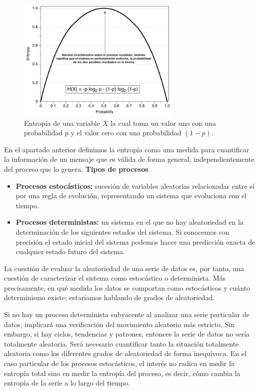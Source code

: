 \documentclass[a4paper,12pt]{article}
\begin{document}
\begin{figure}[H]
	\begin{center}
	\includegraphics[width=0.7\textwidth]{entropy2.png}
  	\caption{Entropía de una variable $X$ la cual toma un valor uno con una probabilidad $p$ y el valor cero con una probabilidad $(1-p)$.}
  	\label{fig:entropy}
  	\end{center}
\end{figure}

En el apartado anterior definimos la entropía como una medida para cuantificar la información de un mensaje que es válida de forma general, independientemente del proceso que lo genera. 
\textbf{Tipos de procesos}
\begin{itemize}
	\item \textbf{Procesos estocásticos:} sucesión de variables aleatorias relacionadas entre sí por una regla de evolución, representando un sistema que evoluciona con el tiempo. 
	\item \textbf{Procesos deterministas:} un sistema en el que no hay aleatoriedad en la determinación de los siguientes estados del sistema. Si conocemos con precisión el estado inicial del sistema podemos hacer una predicción exacta de cualquier estado futuro del sistema.
\end{itemize}

La cuestión de evaluar la aleatoriedad de una serie de datos es, por tanto, una cuestión de caracterizar el sistema como estocástico o determinista. Más precisamente, en qué medida los datos se comportan como estocásticos y cuánto determinismo existe; estaríamos hablando de grados de aleatoriedad. 

Si no hay un proceso determinista subyacente al analizar una serie particular de datos, implicará una verificación del movimiento aleatorio más estricto. Sin embargo, si hay ciclos, tendencias y patrones, entonces la serie de datos no sería totalmente aleatoria. Será necesario cuantificar tanto la situación totalmente aleatoria como los diferentes grados de aleatoriedad de forma inequívoca. En el caso particular de los procesos estocásticos, el interés no radica en medir la entropía total sino en medir la entropía del proceso, es decir, cómo cambia la entropía de la serie a lo largo del tiempo. 
\end{document}
